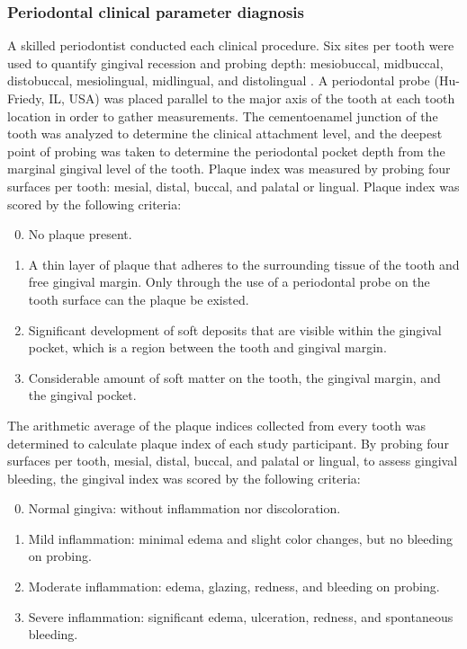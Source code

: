 \documentclass[11pt, a4paper, onecolumn, oneside]{report}
\begin{document}
            \subsubsection{Periodontal clinical parameter diagnosis}
                A skilled periodontist conducted each clinical procedure. Six sites per tooth were used to quantify gingival recession and probing depth: mesiobuccal, midbuccal, distobuccal, mesiolingual, midlingual, and distolingual \cite{Periodontitis-3}. A periodontal probe (Hu-Friedy, IL, USA) was placed parallel to the major axis of the tooth at each tooth location in order to gather measurements. The cementoenamel junction of the tooth was analyzed to determine the clinical attachment level, and the deepest point of probing was taken to determine the periodontal pocket depth from the marginal gingival level of the tooth. Plaque index was measured by probing four surfaces per tooth: mesial, distal, buccal, and palatal or lingual. Plaque index was scored by the following criteria:
                \begin{enumerate}
                    \setcounter{enumi}{-1}
                    \item No plaque present.
                    \item A thin layer of plaque that adheres to the surrounding tissue of the tooth and free gingival margin. Only through the use of a periodontal probe on the tooth surface can the plaque be existed.
                    \item Significant development of soft deposits that are visible within the gingival pocket, which is a region between the tooth and gingival margin.
                    \item Considerable amount of soft matter on the tooth, the gingival margin, and the gingival pocket.
                \end{enumerate}

                The arithmetic average of the plaque indices collected from every tooth was determined to calculate plaque index of each study participant. By probing four surfaces per tooth, mesial, distal, buccal, and palatal or lingual, to assess gingival bleeding, the gingival index was scored by the following criteria:
                \begin{enumerate}
                    \setcounter{enumi}{-1}
                    \item Normal gingiva: without inflammation nor discoloration.
                    \item Mild inflammation: minimal edema and slight color changes, but no bleeding on probing.
                    \item Moderate inflammation: edema, glazing, redness, and bleeding on probing.
                    \item Severe inflammation: significant edema, ulceration, redness, and spontaneous bleeding.
                \end{enumerate}
\end{document}
